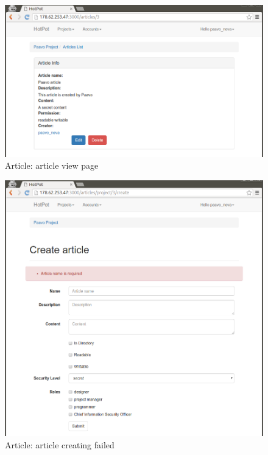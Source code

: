 \begin{figure}[bth]
\myfloatalign
\includegraphics[width=1.0\linewidth]{gfx/chapter_5/article/article_view}
\caption[Article: article view page]{Article: article view page}
\label{fig:user_guide:article:article_view}
\end{figure}

\begin{figure}[bth]
\myfloatalign
\includegraphics[width=1.0\linewidth]{gfx/chapter_5/article/article_create_failed}
\caption[Article: article list]{Article: article creating failed}
\label{fig:user_guide:article:article_create_failed}
\end{figure}

